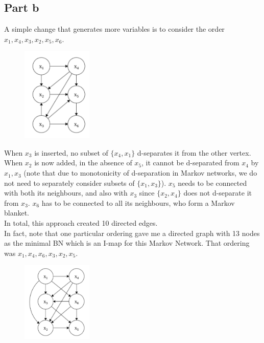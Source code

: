 \subsection{Part b}
A simple change that generates more variables is to consider the order $x_1, x_4, x_3, x_2, x_5, x_6$.
\begin{figure}[H]
    \centering
    \includegraphics[width=0.3\textwidth]{../images/BN_Q9_2.png}
\end{figure}
When $x_3$ is inserted, no subset of $\{x_4, x_1\}$ d-separates it from the other vertex. When $x_2$ is now added, in the absence of $x_5$, it cannot be d-separated from $x_4$ by $x_1, x_3$ (note that due to monotonicity of d-separation in Markov networks, we do not need to separately consider subsets of $\{x_1, x_3\}$). $x_5$ needs to be connected with both its neighbours, and also with $x_3$ since $\{x_2, x_4\}$ does not d-separate it from $x_3$. $x_6$ has to be connected to all its neighbours, who form a Markov blanket.\\
In total, this approach created 10 directed edges.\\

In fact, note that one particular ordering gave me a directed graph with 13 nodes as the minimal BN which is an I-map for this Markov Network. That ordering was $x_1, x_4, x_6, x_3, x_2, x_5$.\\
\begin{figure}[H]
    \centering
    \includegraphics[width=0.3\textwidth]{../images/BN_Q9_3.png}
\end{figure}

